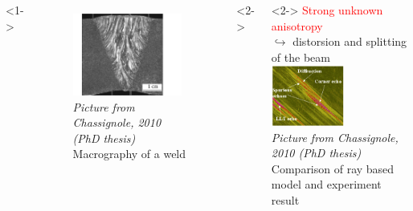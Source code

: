 \documentclass[10pt,xcolor=x11names,compress, notes=show]{beamer}%
\begin{document}
\begin{frame}{\insertsectionhead}
\vspace{-1cm}
\hspace{1cm}
	\begin{columns}[c]
			<1->
			\centering
			\begin{figure}
				\includegraphics[height=2.7cm]{./img/soudure1.png}\\
				{\tiny{ \itshape Picture from Chassignole, 2010 (PhD thesis)} \\ \centering \scriptsize Macrography of a weld }
			\end{figure}
			<2->
			\hspace{-3cm}
			\vspace{2cm}
			<2->
			\hspace{-1cm}
			\textcolor{red}{Strong unknown anisotropy}\\
			$\hookrightarrow$ distorsion and splitting of the beam\\[0.2cm]
			\hspace{-0.5cm}
			\hspace{2cm} \includegraphics[height=2cm]{img/chassignole_echos.png}\\
			\hspace{1cm} {\tiny{ \itshape Picture from Chassignole, 2010 (PhD thesis)} \\ \centering \scriptsize Comparison of ray based model and experiment result } 
				

\end{columns}
\end{frame}
\end{document}
